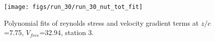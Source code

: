 \begin{figure}[H]
\centering
\texttt{[image: figs/run\_30/run\_30\_nut\_tot\_fit]}
\caption{Polynomial fits of reynolds stress and velocity gradient terms at $z/c$=7.75, $V_{free}$=32.94, station 3.}
\label{fig:run_30_nut_tot_fit}
\end{figure}


